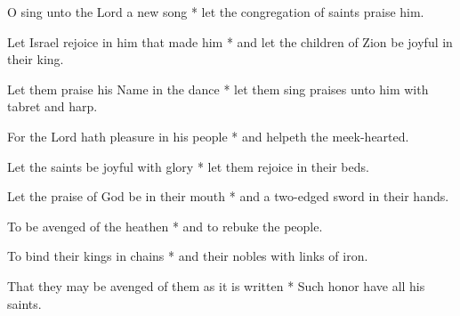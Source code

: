 O sing unto the Lord a new song * let the congregation of saints praise him.

Let Israel rejoice in him that made him * and let the children of Zion be joyful in their king.

Let them praise his Name in the dance * let them sing praises unto him with tabret and harp.

For the Lord hath pleasure in his people * and helpeth the meek-hearted.

Let the saints be joyful with glory * let them rejoice in their beds.

Let the praise of God be in their mouth * and a two-edged sword in their hands.

To be avenged of the heathen * and to rebuke the people.

To bind their kings in chains * and their nobles with links of iron.

That they may be avenged of them as it is written * Such honor have all his saints.